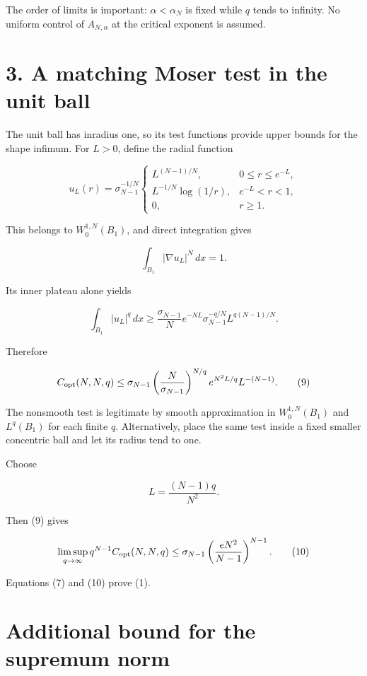 \documentclass[11pt,a4paper]{article}
\begin{document}
The order of limits is important: \(\alpha <\alpha _N\) is fixed while
\(q\) tends to infinity. No uniform control of \(A_{N,\alpha}\) at the
critical exponent is assumed.

\hypertarget{1016-a-matching-moser-test-in-the-unit-ball}{%
\section{3. A matching Moser test in the unit
ball}\label{1016-a-matching-moser-test-in-the-unit-ball}}

The unit ball has inradius one, so its test functions provide upper
bounds for the shape infimum. For \(L>0\), define the radial function

\[
u_L(r)=\sigma_{N-1}^{-1/N}
\begin{cases}
L^{(N-1)/N},&0\le r\le e^{-L},\\
L^{-1/N}\log(1/r),&e^{-L}<r<1,\\
0,&r\ge1.
\end{cases}
\]

This belongs to \(W_0^{1,N}(B_1)\), and direct integration gives

\[
\int_{B_1}|\nabla u_L|^N\,dx=1.
\tag{8}
\]

Its inner plateau alone yields

\[
\int_{B_1}|u_L|^q\,dx
\ge\frac{\sigma_{N-1}}{N}e^{-NL}
\sigma_{N-1}^{-q/N}L^{q(N-1)/N}.
\]

Therefore

\[
C_{\rm opt}(N,N,q)
\le \sigma_{N-1}
\left(\frac N{\sigma_{N-1}}\right)^{N/q}
e^{N^2L/q}L^{-(N-1)}.
\tag{9}
\]

The nonsmooth test is legitimate by smooth approximation in
\(W_0^{1,N}(B_1)\) and \(L^q(B_1)\) for each finite \(q\).
Alternatively, place the same test inside a fixed smaller concentric
ball and let its radius tend to one.

Choose

\[
L=\frac{(N-1)q}{N^2}.
\]

Then (9) gives

\[
\limsup_{q\to\infty}q^{N-1}C_{\rm opt}(N,N,q)
\le\sigma_{N-1}\left(\frac{eN^2}{N-1}\right)^{N-1}.
\tag{10}
\]

Equations (7) and (10) prove (1).

\hypertarget{1016-additional-bound-for-the-supremum-norm}{%
\section{Additional bound for the supremum
norm}\label{1016-additional-bound-for-the-supremum-norm}}
\end{document}
